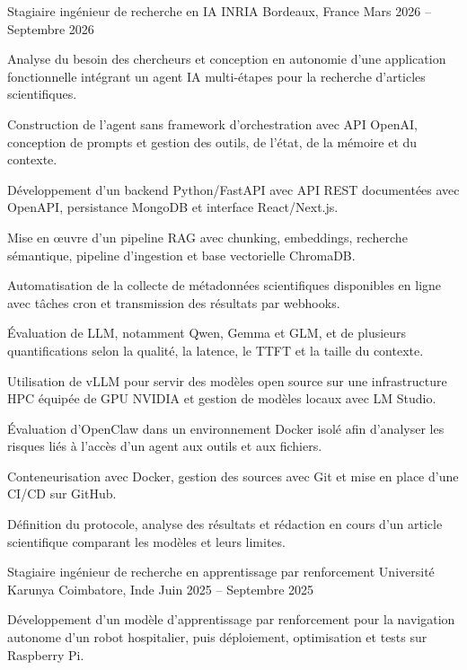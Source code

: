 
\begin{cventries}
  \cventry
    {Stagiaire ingénieur de recherche en IA}
    {INRIA}
    {Bordeaux, France}
    {Mars 2026 -- Septembre 2026}
    {
      \begin{cvitems}
        \item {Analyse du besoin des chercheurs et conception en autonomie d’une application fonctionnelle intégrant un agent IA multi-étapes pour la recherche d’articles scientifiques.}
        \item {Construction de l’agent sans framework d’orchestration avec API OpenAI, conception de prompts et gestion des outils, de l’état, de la mémoire et du contexte.}
        \item {Développement d’un backend Python/FastAPI avec API REST documentées avec OpenAPI, persistance MongoDB et interface React/Next.js.}
        \item {Mise en œuvre d’un pipeline RAG avec chunking, embeddings, recherche sémantique, pipeline d’ingestion et base vectorielle ChromaDB.}
        \item {Automatisation de la collecte de métadonnées scientifiques disponibles en ligne avec tâches cron et transmission des résultats par webhooks.}
        \item {Évaluation de LLM, notamment Qwen, Gemma et GLM, et de plusieurs quantifications selon la qualité, la latence, le TTFT et la taille du contexte.}
        \item {Utilisation de vLLM pour servir des modèles open source sur une infrastructure HPC équipée de GPU NVIDIA et gestion de modèles locaux avec LM Studio.}
        \item {Évaluation d’OpenClaw dans un environnement Docker isolé afin d’analyser les risques liés à l’accès d’un agent aux outils et aux fichiers.}
        \item {Conteneurisation avec Docker, gestion des sources avec Git et mise en place d’une CI/CD sur GitHub.}
        \item {Définition du protocole, analyse des résultats et rédaction en cours d’un article scientifique comparant les modèles et leurs limites.}
      \end{cvitems}
    }

  \cventry
    {Stagiaire ingénieur de recherche en apprentissage par renforcement}
    {Université Karunya}
    {Coimbatore, Inde}
    {Juin 2025 -- Septembre 2025}
    {
      \begin{cvitems}
        \item {Développement d’un modèle d’apprentissage par renforcement pour la navigation autonome d’un robot hospitalier, puis déploiement, optimisation et tests sur Raspberry Pi.}
      \end{cvitems}
    }
\end{cventries}
